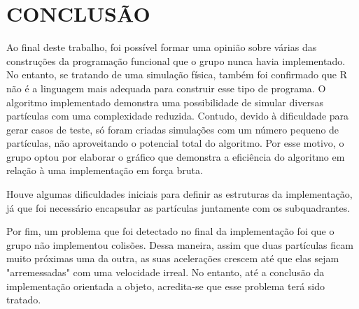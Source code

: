 \documentclass[rel_mlp]{iiufrgs}
\begin{document}
%
\chapter{CONCLUSÃO}

Ao final deste trabalho, foi possível formar uma opinião sobre várias das construções da programação funcional que o grupo nunca havia implementado. No entanto, se tratando de uma simulação física, também foi confirmado que R não é a linguagem mais adequada para construir esse tipo de programa.
O algoritmo implementado demonstra uma possibilidade de simular diversas partículas com uma complexidade reduzida. Contudo, devido à dificuldade para gerar casos de teste, só foram criadas simulações com um número pequeno de partículas, não aproveitando o potencial total do algoritmo. Por esse motivo, o grupo optou por elaborar o gráfico que demonstra a eficiência do algoritmo em relação à uma implementação em força bruta.

Houve algumas dificuldades iniciais para definir as estruturas da implementação, já que foi necessário encapsular
as partículas juntamente com os subquadrantes.

Por fim, um problema que foi detectado no final da implementação foi que o grupo não implementou colisões.
Dessa maneira, assim que duas partículas ficam muito próximas uma da outra, as suas acelerações crescem até que elas sejam "arremessadas" com uma velocidade irreal. No entanto, até a conclusão da implementação
orientada a objeto, acredita-se que esse problema terá sido tratado.



%






\end{document}
